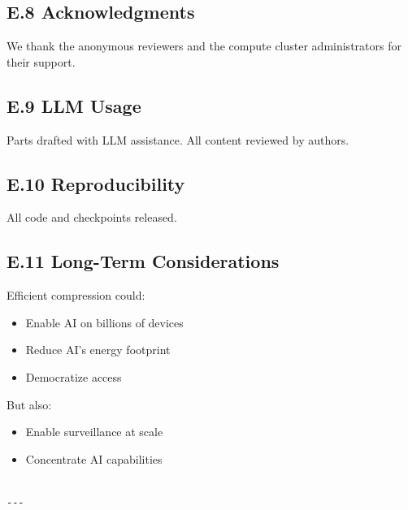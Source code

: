 \subsection{E.8 Acknowledgments}

We thank the anonymous reviewers and the compute cluster administrators for their support.

\subsection{E.9 LLM Usage}

Parts drafted with LLM assistance. All content reviewed by authors.

\subsection{E.10 Reproducibility}

All code and checkpoints released.

\subsection{E.11 Long-Term Considerations}

Efficient compression could:

\begin{itemize}
\item Enable AI on billions of devices
\item Reduce AI's energy footprint
\item Democratize access

\end{itemize}
But also:

\begin{itemize}
\item Enable surveillance at scale
\item Concentrate AI capabilities
\end{itemize}
\begin{lstlisting}

---
\end{lstlisting}